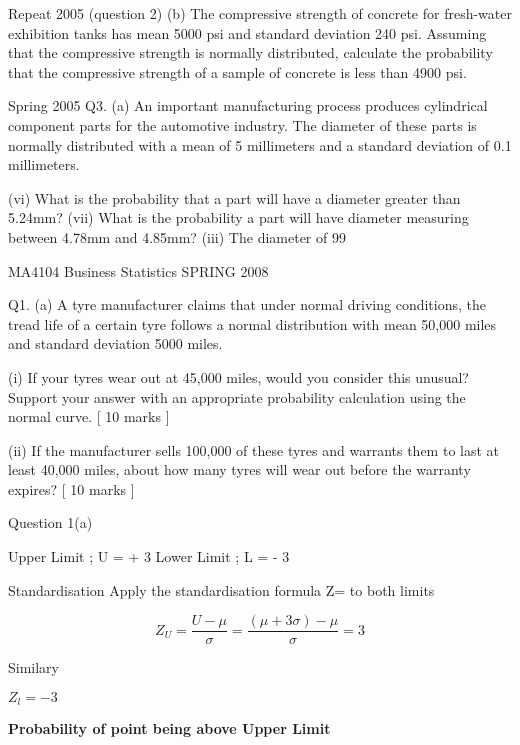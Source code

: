 \documentclass[a4]{beamer}
\begin{document}
Repeat 2005 (question 2)
(b)	The compressive strength of concrete for fresh-water exhibition tanks has mean 5000 psi and standard deviation 240 psi. Assuming that the compressive strength is normally distributed, calculate the probability that the compressive strength of a sample of concrete is less than 4900 psi.
 

Spring 2005 
Q3.    (a)	An important manufacturing process produces cylindrical component parts for the automotive industry. The diameter of these parts is normally distributed with a mean of 5 millimeters and a standard deviation of 0.1 millimeters.

(vi)	What is the probability that a part will have a diameter greater than 5.24mm?
(vii)	What is the probability a part will have diameter measuring between 4.78mm and 4.85mm?
(iii)	The diameter of 99%


MA4104 Business Statistics SPRING 2008

Q1. (a) A tyre manufacturer claims that under normal driving conditions, the tread life of a certain tyre follows a normal distribution with mean 50,000 miles and standard deviation 5000 miles. 

(i) If your tyres wear out at 45,000 miles, would you consider this unusual? Support your answer with an appropriate probability calculation using the normal curve. [ 10 marks ] 

(ii) If the manufacturer sells 100,000 of these tyres and warrants them to last at least 40,000 miles, about how many tyres will wear out before the warranty expires? [ 10 marks ]




Question 1(a)

Upper Limit ;  U = \mu + 3 \sigma 
Lower Limit ;  L = \mu - 3 \sigma

Standardisation
Apply the standardisation formula	Z= 	to both limits

\[ Z_U = \frac{U-\mu}{\sigma} =  \frac{(\mu + 3 \sigma)-\mu}{\sigma} = 3\]
 
Similary

$Z_l=-3$ 

\noindent \textbf{Probability of point being above Upper Limit}
\end{document}
